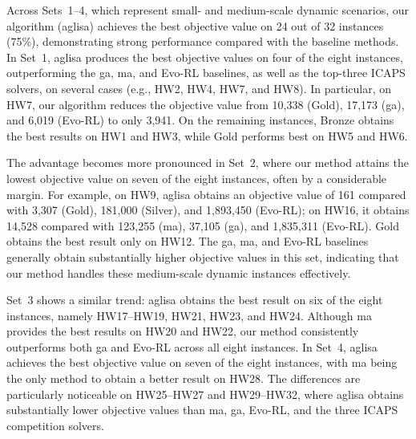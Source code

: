 \documentclass[pdflatex]{sn-jnl}
\begin{document}
Across Sets~1--4, which represent small- and medium-scale dynamic scenarios, our algorithm (\gls{aglisa}) achieves the best objective value on 24 out of 32 instances (75\%), demonstrating strong performance compared with the baseline methods. In Set~1, \gls{aglisa} produces the best objective values on four of the eight instances, outperforming the \gls{ga}, \gls{ma}, and Evo-RL baselines, as well as the top-three ICAPS solvers, on several cases (e.g., HW2, HW4, HW7, and HW8). In particular, on HW7, our algorithm reduces the objective value from 10,338 (Gold), 17,173 (\gls{ga}), and 6,019 (Evo-RL) to only 3,941. On the remaining instances, Bronze obtains the best results on HW1 and HW3, while Gold performs best on HW5 and HW6.

The advantage becomes more pronounced in Set~2, where our method attains the lowest objective value on seven of the eight instances, often by a considerable margin. For example, on HW9, \gls{aglisa} obtains an objective value of 161 compared with 3,307 (Gold), 181,000 (Silver), and 1,893,450 (Evo-RL); on HW16, it obtains 14,528 compared with 123,255 (\gls{ma}), 37,105 (\gls{ga}), and 1,835,311 (Evo-RL). Gold obtains the best result only on HW12. The \gls{ga}, \gls{ma}, and Evo-RL baselines generally obtain substantially higher objective values in this set, indicating that our method handles these medium-scale dynamic instances effectively.

Set~3 shows a similar trend: \gls{aglisa} obtains the best result on six of the eight instances, namely HW17--HW19, HW21, HW23, and HW24. Although \gls{ma} provides the best results on HW20 and HW22, our method consistently outperforms both \gls{ga} and Evo-RL across all eight instances. In Set~4, \gls{aglisa} achieves the best objective value on seven of the eight instances, with \gls{ma} being the only method to obtain a better result on HW28. The differences are particularly noticeable on HW25--HW27 and HW29--HW32, where \gls{aglisa} obtains substantially lower objective values than \gls{ma}, \gls{ga}, Evo-RL, and the three ICAPS competition solvers.
\end{document}
